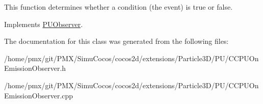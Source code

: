 This function determines whether a condition (the event) is true or false. 

Implements \hyperlink{classPUObserver_a50f59cc3245e291b641463db5d3037f7}{P\+U\+Observer}.



The documentation for this class was generated from the following files\+:\begin{DoxyCompactItemize}
\item 
/home/pmx/git/\+P\+M\+X/\+Simu\+Cocos/cocos2d/extensions/\+Particle3\+D/\+P\+U/C\+C\+P\+U\+On\+Emission\+Observer.\+h\item 
/home/pmx/git/\+P\+M\+X/\+Simu\+Cocos/cocos2d/extensions/\+Particle3\+D/\+P\+U/C\+C\+P\+U\+On\+Emission\+Observer.\+cpp\end{DoxyCompactItemize}
